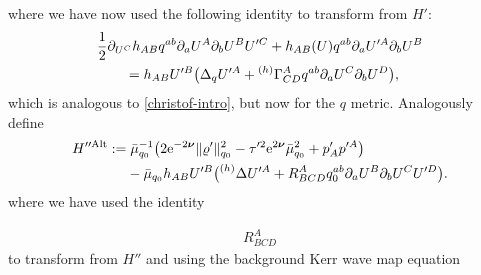 \documentclass[11pt]{article}
\numberwithin{equation}{section}
\def\ptl{\partial}%
\def\mbo#1{\boldsymbol{#1}}%
\newcommand{\leftexp}[2]{{\vphantom{#2}}^{#1}{#2}}
\def\halb{\frac{1}{2}}%
\numberwithin{equation}{section}
\begin{document}
where we have now used the following identity to transform from $H'$:
\begin{align*}
&\halb \ptl_{U^C} h_{AB} q^{ab} \ptl_a U^A \ptl_b U^B U'^C + h_{AB}(U) q^{ab} \ptl_a U'^A \ptl_b U^B \notag\\
&\qquad{}= h_{AB} U'^B \bigl(\Delta_q U'^A + \leftexp{(h)}{\Gamma}^A _{CD} q^{ab} \ptl_a U^C \ptl_b U^D\bigr),
\end{align*}
which is analogous to \eqref{christof-intro}, but now for the $q$ metric. %
Analogously define
\begin{align*}
H''^{{\rm Alt}} &:= \bar{\mu}^{-1}_{q_0} \bigl(2 {\rm e}^{-2 \mbo{\nu}} \Vert \varrho' \Vert^2_{q_0} - \tau'^2 {\rm e}^{2 \mbo{\nu}} \bar{\mu}^2_{q_0} + p'_A p'^A\bigr) \notag\\
&\ \quad{}- \bar{\mu}_{q_0} h_{AB} U'^B\bigl(\leftexp{(h)}{\Delta} U'^A +R^A_{BCD} q_0^{ab} \ptl_a U^B \ptl_b U^C U'^D\bigr).
\end{align*}
\iffalse
where we have used the identity

\begin{align}
R^{A}_{BCD}
\end{align}
to transform from $H''$ and using the background Kerr wave map equation
\end{document}
